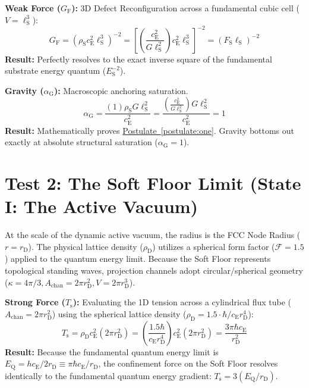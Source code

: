 \vspace{0.2em}
\noindent \textbf{Weak Force ($G_{\mathrm{F}}$):} 3D Defect Reconfiguration across a fundamental cubic cell ($V = \ell_{\mathrm{S}}^3$):
\begin{equation}
    G_{\mathrm{F}} = (\rho_{\mathrm{S}} c_{\mathrm{E}}^2 \ell_{\mathrm{S}}^3)^{-2} = \left[ \left(\frac{c_{\mathrm{E}}^2}{G\ell_{\mathrm{S}}^2}\right) c_{\mathrm{E}}^2 \ell_{\mathrm{S}}^3 \right]^{-2} = (F_{\mathrm{S}} \ell_{\mathrm{S}})^{-2}
\end{equation}
\noindent \textbf{Result:} Perfectly resolves to the exact inverse square of the fundamental substrate energy quantum ($E_{\mathrm{S}}^{-2}$).

\vspace{0.2em}
\noindent \textbf{Gravity ($\alpha_{\mathrm{G}}$):} Macroscopic anchoring saturation.
\begin{equation}
    \alpha_{\mathrm{G}} = \frac{(1) \rho_{\mathrm{S}} G \ell_{\mathrm{S}}^2}{c_{\mathrm{E}}^2} = \frac{\left(\frac{c_{\mathrm{E}}^2}{G\ell_{\mathrm{S}}^2}\right) G \ell_{\mathrm{S}}^2}{c_{\mathrm{E}}^2} = 1
\end{equation}
\noindent \textbf{Result:} Mathematically proves \hyperref[postulate:one]{Postulate~\ref*{postulate:one}}. Gravity bottoms out exactly at absolute structural saturation ($\alpha_{\mathrm{G}} = 1$).

\section{Test 2: The Soft Floor Limit (State I: The Active Vacuum)}
At the scale of the dynamic active vacuum, the radius is the FCC Node Radius ($r = r_{\mathrm{D}}$). The physical lattice density ($\rho_{\mathrm{D}}$) utilizes a spherical form factor ($\mathcal{F} = 1.5$) applied to the quantum energy limit. Because the Soft Floor represents topological standing waves, projection channels adopt circular/spherical geometry ($\kappa = 4\pi/3, A_{\mathrm{chan}} = 2\pi r_{\mathrm{D}}^2, V = 2\pi r_{\mathrm{D}}^3$).

\vspace{0.2em}
\noindent \textbf{Strong Force ($T_{\mathrm{s}}$):} Evaluating the 1D tension across a cylindrical flux tube ($A_{\mathrm{chan}} = 2\pi r_{\mathrm{D}}^2$) using the spherical lattice density ($\rho_{\mathrm{D}} = 1.5 \cdot \hbar / c_{\mathrm{E}} r_{\mathrm{D}}^4$):
\begin{equation}
    T_{\mathrm{s}} = \rho_{\mathrm{D}} c_{\mathrm{E}}^2 (2\pi r_{\mathrm{D}}^2) = \left(\frac{1.5\hbar}{c_{\mathrm{E}} r_{\mathrm{D}}^4}\right) c_{\mathrm{E}}^2 (2\pi r_{\mathrm{D}}^2) = \frac{3\pi\hbar c_{\mathrm{E}}}{r_{\mathrm{D}}^2}
\end{equation}
\noindent \textbf{Result:} Because the fundamental quantum energy limit is $E_{\mathrm{Q}} = hc_{\mathrm{E}} / 2r_{\mathrm{D}} \equiv \pi\hbar c_{\mathrm{E}} / r_{\mathrm{D}}$, the confinement force on the Soft Floor resolves identically to the fundamental quantum energy gradient: $T_{\mathrm{s}} = 3(E_{\mathrm{Q}}/r_{\mathrm{D}})$.

